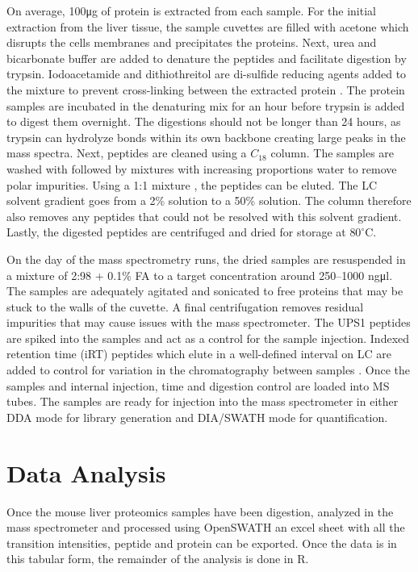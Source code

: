 \documentclass[a4paper,11pt,twoside]{book}
\begin{document}
	On average, 100\si{\micro\gram} of protein is extracted from each sample. For the initial extraction from the liver tissue, the sample cuvettes are filled with acetone which disrupts the cells membranes and precipitates the proteins. Next, urea and bicarbonate buffer are added to denature the peptides and facilitate digestion by trypsin. Iodoacetamide and dithiothreitol are di-sulfide reducing agents added to the mixture to prevent cross-linking between the extracted protein \citep{Voet2011Biochemistry}. The protein samples are incubated in the denaturing mix for an hour before trypsin is added to digest them overnight. The digestions should not be longer than 24 hours, as trypsin can hydrolyze bonds within its own backbone creating large peaks in the mass spectra. Next, peptides are cleaned using a $C_18$ column. The samples are washed with  followed by mixtures  with increasing proportions water to remove polar impurities. Using a 1:1 mixture , the peptides can be eluted. The LC solvent gradient goes from a 2\%  solution to a 50\% solution. The column therefore also removes any peptides that could not be resolved with this solvent gradient. Lastly, the digested peptides are centrifuged and dried for storage at $80^\circ$C. 

	On the day of the mass spectrometry runs, the dried samples are resuspended in a mixture of 2:98 + 0.1\% FA to a target concentration around 250–1000 ng\si{\micro\litre}. The samples are adequately agitated and sonicated to free proteins that may be stuck to the walls of the cuvette. A final centrifugation removes residual impurities that may cause issues with the mass spectrometer. The UPS1 peptides are spiked into the samples and act as a control for the sample injection. Indexed retention time (iRT) peptides which elute in a well-defined interval on LC are added to control for variation in the chromatography between samples \citep{Escher2012UsingPeptides.}. Once the samples and internal injection, time and digestion control are loaded into MS tubes. The samples are ready for injection into the mass spectrometer in either DDA mode for library generation and DIA/SWATH mode for quantification.
	
	\section{Data Analysis}

	Once the mouse liver proteomics samples have been digestion, analyzed in the mass spectrometer and processed using OpenSWATH an excel sheet with all the transition intensities, peptide and protein can be exported. Once the data is in this tabular form, the remainder of the analysis is done in R.
	
\end{document}
